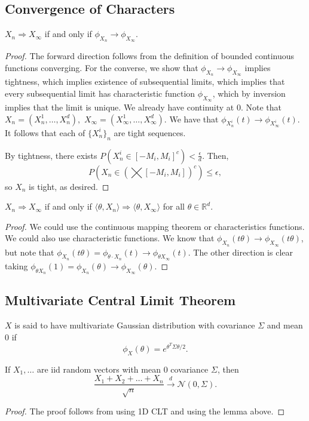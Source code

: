 \documentclass[11pt]{scrartcl}
\newcommand{\R}{\mathbb{R}}
\begin{document}
\subsection{Convergence of Characters}
\begin{thm} $X_n \Rightarrow X_{\infty}$ if and only if $\phi_{X_n} \to \phi_{X_\infty}$.  
\end{thm}
\begin{proof}
The forward direction follows from the definition of bounded continuous functions converging.  For the converse, we show that $\phi_{X_n} \to \phi_{X_\infty}$ implies tightness, which implies existence of subsequential limits, which implies that every subsequential limit has characteristic function $\phi_{X_\infty}$, which by inversion implies that the limit is unique.  We already have continuity at $0$.  Note that $X_n = (X_n^1, \dots, X_n^d),$ $X_{\infty} = (X_\infty^1, \dots, X_\infty^d).$  We have that $\phi_{X_n^i}(t) \to \phi_{X_\infty^i}(t)$.  It follows that each of $\{X_n^i\}_n$ are tight sequences.  

By tightness, there exists $P(X_n^i \in [-M_i, M_i]^c) < \frac{\epsilon}{d}$.  Then,
$$P(X_n \in (\bigtimes [-M_i, M_i])^c) \le \epsilon,$$
so $X_n$ is tight, as desired.
\end{proof}
\begin{proposition} $X_n \Rightarrow X_\infty$ if and only if $\langle \theta, X_n \rangle \Rightarrow \langle \theta, X_\infty \rangle$ for all $\theta \in \R^d$.
\end{proposition}
\begin{proof}
We could use the continuous mapping theorem or characteristics functions.  We could also use characteristic functions.  We know that $\phi_{X_n}(t\theta) \to \phi_{X_\infty}(t\theta)$, but note that $\phi_{X_n}(t \theta) = \phi_{\theta \cdot X_n }(t) \to \phi_{\theta X_\infty}(t).$  The other direction is clear taking $\phi_{\theta X_n}(1) = \phi_{X_n} (\theta) \to \phi_{X_\infty}(\theta).$
\end{proof}


\subsection{Multivariate Central Limit Theorem}

\begin{definition}  $X$ is said to have multivariate Gaussian distribution with covariance $\Sigma$ and mean $0$ if 
$$\phi_X(\theta) = e^{\theta^T \Sigma \theta / 2}.$$
\end{definition}
\begin{thm} If $X_1, \dots$ are iid random vectors with mean $0$ covariance $\Sigma$, then 
$$\frac{X_1 + X_2 + \dots + X_n}{\sqrt{n}} \xrightarrow{d} \mathcal N(0, \Sigma).$$ 
\end{thm}
\begin{proof}
The proof follows from using 1D CLT and using the lemma above.  
\end{proof}
\end{document}
